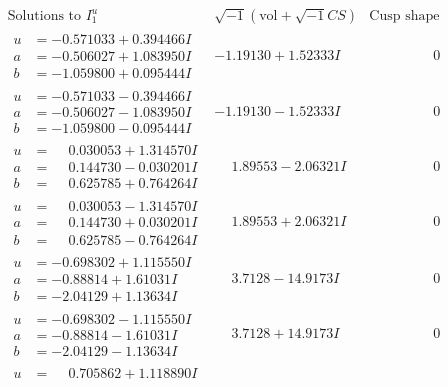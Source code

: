 \documentclass[1p]{elsarticle_modified}
\theoremstyle{definition}
\newcommand{\I}{\sqrt{-1}}
\begin{document}
$$\begin{array}{c|c|c}
\text{Solutions to }I^u_{1}& \I (\text{vol} + \sqrt{-1}CS) & \text{Cusp shape}\\
 \hline 
\begin{aligned}
u &= -0.571033 + 0.394466 I \\
a &= -0.506027 + 1.083950 I \\
b &= -1.059800 + 0.095444 I\end{aligned}
 & -1.19130 + 1.52333 I & \phantom{-0.000000 } 0 \\ \hline\begin{aligned}
u &= -0.571033 - 0.394466 I \\
a &= -0.506027 - 1.083950 I \\
b &= -1.059800 - 0.095444 I\end{aligned}
 & -1.19130 - 1.52333 I & \phantom{-0.000000 } 0 \\ \hline\begin{aligned}
u &= \phantom{-}0.030053 + 1.314570 I \\
a &= \phantom{-}0.144730 - 0.030201 I \\
b &= \phantom{-}0.625785 + 0.764264 I\end{aligned}
 & \phantom{-}1.89553 - 2.06321 I & \phantom{-0.000000 } 0 \\ \hline\begin{aligned}
u &= \phantom{-}0.030053 - 1.314570 I \\
a &= \phantom{-}0.144730 + 0.030201 I \\
b &= \phantom{-}0.625785 - 0.764264 I\end{aligned}
 & \phantom{-}1.89553 + 2.06321 I & \phantom{-0.000000 } 0 \\ \hline\begin{aligned}
u &= -0.698302 + 1.115550 I \\
a &= -0.88814 + 1.61031 I \\
b &= -2.04129 + 1.13634 I\end{aligned}
 & \phantom{-}3.7128 - 14.9173 I & \phantom{-0.000000 } 0 \\ \hline\begin{aligned}
u &= -0.698302 - 1.115550 I \\
a &= -0.88814 - 1.61031 I \\
b &= -2.04129 - 1.13634 I\end{aligned}
 & \phantom{-}3.7128 + 14.9173 I & \phantom{-0.000000 } 0 \\ \hline\begin{aligned}
u &= \phantom{-}0.705862 + 1.118890 I \\

\end{aligned}
\end{array}$$
\end{document}
